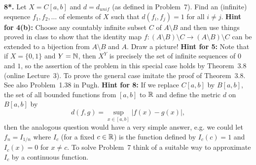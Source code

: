 \documentclass[11pt]{amsart}
\begin{document}
{\bf 8*.} Let $X=C[a,b]$ and $d=d_{unif}$ (as defined in Problem~7). Find an (infinite) sequence $f_1,f_2,\ldots$ of elements of $X$ such that $d(f_i,f_j)=1$ for all $i\neq j$.
\newpage
{\bf Hint for 4(b):} Choose any countably infinite subset $C$ of $A\setminus B$ and then
use things proved in class to show that the identity map 
$f:(A\setminus B)\setminus C\to (A\setminus B)\setminus C$ can be extended
to a bijection from $A\setminus B$ and $A$. Draw a picture!
\newpage
{\bf Hint for 5:} Note that if $X=\{0,1\}$ and $Y={\mathbb N}$, then $X^Y$ is precisely the set of infinite sequences of $0$ and $1$,
so the assertion of the problem in this special case holds by Theorem~3.8 (online Lecture~3). To prove the general case imitate the proof of 
Theorem~3.8. See also Problem~1.38 in Pugh.
\newpage
{\bf Hint for 8:} If we replace $C[a,b]$ by $B[a,b]$, the set of all bounded functions from $[a,b]$ to ${\mathbb R}$ and define the metric $d$ on $B[a,b]$ by $$d(f,g)=\sup\limits_{x\in [a,b]}|f(x)-g(x)|,$$ then the analogous question would have a very simple answer, e.g. we could let $f_n=I_{1/n}$ where $I_c$ (for a fixed $c\in{\mathbb R}$) is the function defined by $I_c(c)=1$ and $I_c(x)=0$ for $x\neq c$. To solve  Problem~7 think of a suitable way to approximate $I_c$ by a continuous function. 
\end{document}
